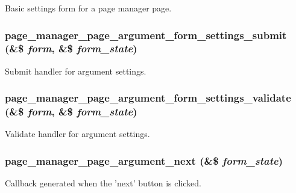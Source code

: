 \label{page_8admin_8inc_adb96c0403fa9be5216a7638e0ac7d729}
Basic settings form for a page manager page. \hypertarget{page_8admin_8inc_a3f75567ac4098a396875e986a3e3c027}{
\subsubsection[{page\_\-manager\_\-page\_\-argument\_\-form\_\-settings\_\-submit}]{\setlength{\rightskip}{0pt plus 5cm}page\_\-manager\_\-page\_\-argument\_\-form\_\-settings\_\-submit (\&\$ {\em form}, \/  \&\$ {\em form\_\-state})}}
\label{page_8admin_8inc_a3f75567ac4098a396875e986a3e3c027}
Submit handler for argument settings. \hypertarget{page_8admin_8inc_a38198c5b12e1c5ca00fd71d5270f4758}{
\subsubsection[{page\_\-manager\_\-page\_\-argument\_\-form\_\-settings\_\-validate}]{\setlength{\rightskip}{0pt plus 5cm}page\_\-manager\_\-page\_\-argument\_\-form\_\-settings\_\-validate (\&\$ {\em form}, \/  \&\$ {\em form\_\-state})}}
\label{page_8admin_8inc_a38198c5b12e1c5ca00fd71d5270f4758}
Validate handler for argument settings. \hypertarget{page_8admin_8inc_ac0fd0f2e4848540bcdea083954d17a0e}{
\subsubsection[{page\_\-manager\_\-page\_\-argument\_\-next}]{\setlength{\rightskip}{0pt plus 5cm}page\_\-manager\_\-page\_\-argument\_\-next (\&\$ {\em form\_\-state})}}
\label{page_8admin_8inc_ac0fd0f2e4848540bcdea083954d17a0e}
Callback generated when the 'next' button is clicked.

